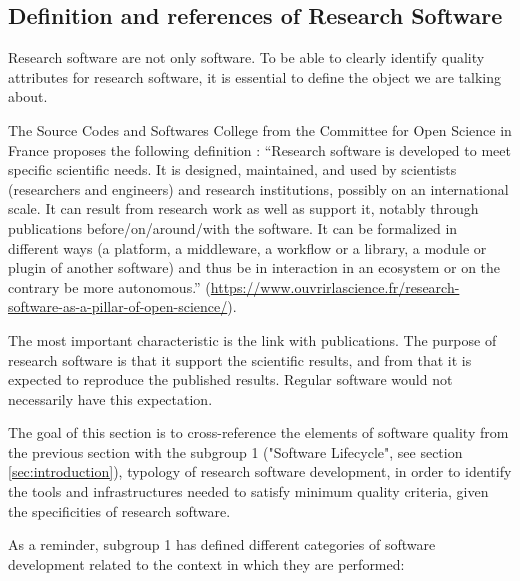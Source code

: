 \subsection{Definition and references of Research Software}

Research software are not only software. To be able to clearly
identify quality attributes for research software, it is essential to
define the object we are talking about.

The Source Codes and Softwares College from the Committee for Open
Science in France proposes the following definition : 
``Research software is developed to meet specific scientific needs. It
is designed, maintained, and used by scientists (researchers and
engineers) and research institutions, possibly on an international
scale. It can result from research work as well as support it, notably
through publications before/on/around/with the software. It can be
formalized in different ways (a platform, a middleware, a workflow or
a library, a module or plugin of another software) and thus be in
interaction in an ecosystem or on the contrary be more autonomous.''
(\url{https://www.ouvrirlascience.fr/research-software-as-a-pillar-of-open-science/}).

The most important characteristic is the link with publications. The
purpose of research software is that it support the scientific
results, and from that it is expected to reproduce the published
results. Regular software would not necessarily have this expectation.

The goal of this section is to cross-reference the elements of
software quality from the previous section with the subgroup 1
\cite{sg1tf2023} ("Software Lifecycle", see section
\ref{sec:introduction}), typology of research software development, in
order to identify the tools and infrastructures needed to satisfy
minimum quality criteria, given the specificities of research software.  

As a reminder, subgroup 1 has defined different categories of software
development related to the context in which they are performed:

